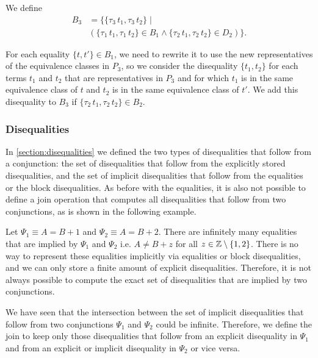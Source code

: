 We define
\[
    \begin{array}{ll}
        B_3 & = \{\{\tau_3\,t_1, \tau_3\,t_2\}  \mid                                                \\
            & (\{\tau_1\,t_1, \tau_1\,t_2\} \in B_1 \land \{\tau_2\,t_1, \tau_2\,t_2\} \in D_2) \}.
    \end{array}
\]

For each equality $\{t, t'\} \in B_1$,
we need to rewrite it to use the new representatives of the equivalence classes in $P_3$,
so we consider the disequality $\{t_1, t_2\}$
for each terms $t_1$ and $t_2$ that are representatives in $P_3$ and for
which $t_1$ is in the same equivalence class of $t$ and $t_2$ is in the same equivalence class of $t'$.
We add this disequality to $B_3$ if $\{\tau_2\,t_1, \tau_2\,t_2\} \in B_2$.


\subsubsection{Disequalities}

In \cref{section:disequalities} we defined the two types of disequalities that follow from a conjunction:
the set of disequalities that follow from the explicitly stored disequalities,
and the set of implicit disequalities that follow from the equalities or the block disequalities.
As before with the equalities, it is also not possible to define a join operation that computes all disequalities that follow from two conjunctions, as is shown in the following example.

\begin{example}
    Let $\Psi_1 \equiv A = B + 1$ and $\Psi_2 \equiv A = B + 2$. There are infinitely many equalities that are implied by $\Psi_1$ and $\Psi_2$ i.e. $A \neq B + z$ for all $z \in \mathbb{Z} \setminus \{1,2\}$.
    There is no way to represent these equalities implicitly via equalities or block disequalities,
    and we can only store a finite amount of explicit disequalities.
    Therefore, it is not always possible to compute the exact set of disequalities that are implied by two conjunctions.
\end{example}

We have seen that the intersection between the set of implicit disequalities that follow from two conjunctions $\Psi_1$ and $\Psi_2$ could be infinite.
Therefore, we define the join to keep only those disequalities that follow from an explicit disequality in $\Psi_1$ and from an explicit or implicit disequality in $\Psi_2$ or vice versa.

